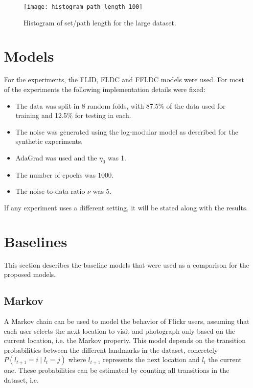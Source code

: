 \begin{figure}
  \centering
  \texttt{[image: histogram\_path\_length\_100]}
  \caption{Histogram of set/path length for the large dataset.}
  \label{fig:histogram_path_length_100}
\end{figure}

\section{Models}

For the experiments, the FLID, FLDC and FFLDC models were used. For most of the experiments the following implementation details were fixed:

\begin{itemize}
  \item The data was split in 8 random folds, with 87.5\% of the data used for training and 12.5\% for testing in each.
  \item The noise was generated using the log-modular model as described for the synthetic experiments.
  \item AdaGrad was used and the $\eta_{0}$ was 1.
  \item The number of epochs was 1000.
  \item The noise-to-data ratio $\nu$ was 5.
\end{itemize}

If any experiment uses a different setting, it will be stated along with the results.

\section{Baselines}
\label{sec:baselines}

This section describes the baseline models that were used as a comparison for the proposed models.

\subsection{Markov}

A Markov chain can be used to model the behavior of Flickr users, assuming that each user selects the next location to visit and photograph only based on the current location, i.e. the Markov property. This model depends on the transition probabilities between the different landmarks in the dataset, concretely $P(l_{t+1} = i \mid l_{t} = j)$ where $l_{t+1}$ represents the next location and $l_{t}$ the current one. These probabilities can be estimated by counting all transitions in the dataset, i.e.


